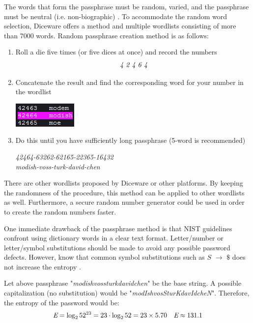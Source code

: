 \documentclass[acmsmall,nonacm]{acmart}
\begin{document}
The words that form the passphrase must be random, varied,  and the passphrase must be neutral (i.e. non-biographic) \cite{nist_2020,Kavrestad_2019}. To accommodate the random word selection, Diceware \cite{reinhold_2021} offers a method and multiple wordlists consisting of more than 7000 words. Random passphrase creation method is as follows:

\renewcommand{\labelenumi}{\arabic{enumi}.}
\begin{enumerate}
    \item Roll a die five times (or five dices at once) and record the numbers 
    \begin{align*}
        \emph{4  2  4  6  4}
    \end{align*}
    \item Concatenate the result and find the corresponding word for your number in the wordlist 
    \begin{center}
        \includegraphics{modish1}
    \end{center}
    
    \item Do this until you have sufficiently long passphrase (5-word is recommended)
    \begin{center}
        \emph{42464-63262-62165-22365-16432}\\
        \emph{modish-voss-turk-david-chen}
    \end{center}
\end{enumerate}

There are other wordlists proposed by Diceware or other platforms. By keeping the randomness of the procedure, this method can be applied to other wordlists as well. Furthermore, a secure random number generator could be used in order to create the random numbers faster.

One immediate drawback of the passphrase method is that NIST guidelines confront using dictionary words in a clear text format. Letter/number or letter/symbol substitutions should be made to avoid any possible password defects. However, know that common symbol substitutions such as $S$ ${\displaystyle \rightarrow }$ $\$$ does not increase the entropy \cite{ur_2015}.

Let above passphrase "\emph{modishvossturkdavidchen}" be the base string. A possible capitalization (no substitution) would be "\emph{modIshvosSturKdavIdcheN}". Therefore, the entropy of the password would be:
\begin{align*}
    \emph{E} = \log_2 52^{23} &= 23 \cdot \log_2 52 = 23 \times 5.70 &\emph{E} \approx 131.1 
\end{align*}
\end{document}
